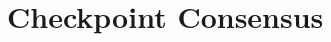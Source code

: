 \documentclass[a4paper,10pt,twoside]{report}
\begin{document}
\clearemptydoublepage

\chapter{Checkpoint Consensus}\label{chapter:consensus}


\clearemptydoublepage

%



%
%
%
\end{document}
